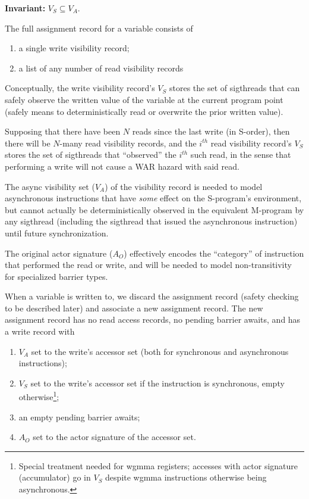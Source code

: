 \textbf{Invariant:} $V_S \subseteq V_A$.

\filbreak
{} The full assignment record for a variable consists of
\begin{enumerate}
  \item a single write visibility record;
  \item a list of any number of read visibility records
\end{enumerate}

\filbreak
Conceptually, the write visibility record's $V_S$ stores the set of sigthreads that can safely observe the written value of the variable at the current program point (safely means to deterministically read or overwrite the prior written value).

\filbreak
Supposing that there have been $N$ reads since the last write (in S-order), then there will be $N$-many read visibility records, and the $i^{th}$ read visibility record's $V_S$ stores the set of sigthreads that ``observed'' the $i^{th}$ such read, in the sense that performing a write will not cause a WAR hazard with said read.

\filbreak
The async visibility set ($V_A$) of the visibility record is needed to model asynchronous instructions that have \textit{some} effect on the S-program's environment, but cannot actually be deterministically observed in the equivalent M-program by any sigthread (including the sigthread that issued the asynchronous instruction) until future synchronization.

\filbreak
The original actor signature ($A_O$) effectively encodes the ``category'' of instruction that performed the read or write, and will be needed to model non-transitivity for specialized barrier types.

\filbreak
{} When a variable is written to, we discard the assignment record (safety checking to be described later) and associate a new assignment record.
The new assignment record has no read access records, no pending barrier awaits, and has a write record with

\filbreak
\begin{enumerate}
  \item $V_A$ set to the write's accessor set (both for synchronous and asynchronous instructions);
  \item $V_S$ set to the write's accessor set if the instruction is synchronous, empty otherwise\footnote{Special treatment needed for wgmma registers; accesses with actor signature  (accumulator) go in $V_S$ despite wgmma instructions otherwise being asynchronous.};
  \item an empty pending barrier awaits;
  \item $A_O$ set to the actor signature of the accessor set.
\end{enumerate}

